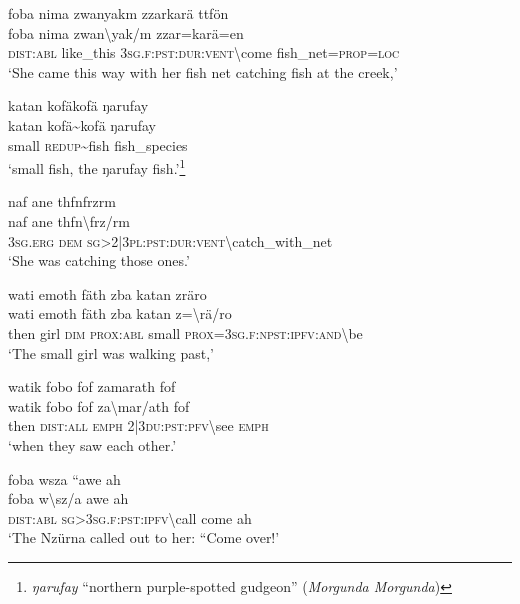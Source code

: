 \ea\label{ex:6:a1208}
foba nima zwanyakm zzarkarä ttfön\\
\gll foba	nima	zwan{\textbackslash}yak/m	zzar=karä=en\\
     \textsc{dist}:\textsc{abl}	like\_this	3\textsc{sg}.\textsc{f}:\textsc{pst}:\textsc{dur}:\textsc{vent}{\textbackslash}come	fish\_net=\textsc{prop}=\textsc{loc}\\
\glt `She came this way with her fish net catching fish at the creek,'
\z

\ea\label{ex:6:a1210}
katan kofäkofä ŋarufay\\
\gll katan	kofä{\textasciitilde}kofä	ŋarufay\\
     small	\textsc{redup}{\textasciitilde}fish	fish\_species\\
\glt `small fish, the ŋarufay fish.'\footnote{\textit{ŋarufay} ``northern purple-spotted gudgeon'' (\textit{Morgunda Morgunda})}
\z

\ea\label{ex:6:a1211}
naf ane thfnfrzrm\\
\gll naf	ane	thfn{\textbackslash}frz/rm\\
     3\textsc{sg}.\textsc{erg}	\textsc{dem}	\textsc{sg}>2|3\textsc{pl}:\textsc{pst}:\textsc{dur}:\textsc{vent}{\textbackslash}catch\_with\_net\\
\glt `She was catching those ones.'
\z

\ea\label{ex:6:a1212}
wati emoth fäth zba katan zräro\\
\gll wati	emoth	fäth	zba	katan	z={\textbackslash}rä/ro\\
     then	girl	\textsc{dim}	\textsc{prox}:\textsc{abl}	small	\textsc{prox}=3\textsc{sg}.\textsc{f}:\textsc{npst}:\textsc{ipfv}:\textsc{and}{\textbackslash}be\\
\glt `The small girl was walking past,'
\z

\ea\label{ex:6:a1213}
watik fobo fof zamarath fof\\
\gll watik	fobo	fof	za{\textbackslash}mar/ath	fof\\
     then	\textsc{dist}:\textsc{all}	\textsc{emph}	2|3\textsc{du}:\textsc{pst}:\textsc{pfv}{\textbackslash}see	\textsc{emph}\\
\glt `when they saw each other.'
\z

\ea\label{ex:6:a1214}
foba wsza ``awe ah\\
\gll foba	w{\textbackslash}sz/a	awe	ah\\
     \textsc{dist}:\textsc{abl}	\textsc{sg}>3\textsc{sg}.\textsc{f}:\textsc{pst}:\textsc{ipfv}{\textbackslash}call	come	ah\\
\glt `The Nzürna called out to her: ``Come over!'
\z

